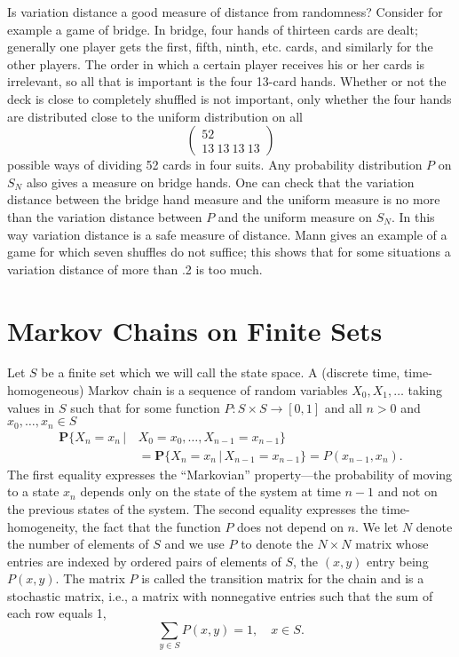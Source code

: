 \documentclass{stml-l}
\theoremstyle{definition}
\numberwithin{equation}{chapter}
\numberwithin{figure}{chapter}
\numberwithin{figure}{section}
\begin{document}
Is variation distance a good measure of distance from randomness?
Consider for example a game of bridge. In bridge, four hands of
thirteen cards are dealt; generally one player gets the first,
fifth, ninth, etc. cards, and similarly for the other players. The
order in which a certain player receives his or her cards is
irrelevant, so all that is important is the four 13-card hands.
Whether or not the deck is close to completely shuffled is not
important, only whether the four hands are distributed close to the
uniform distribution on all
\begin{equation*}
\left(\begin{matrix}
52\\
13\ 13\ 13\ 13
\end{matrix}\right)
\end{equation*}
possible ways of dividing 52 cards in four suits. Any probability
distribution $P$ on $S_{N}$ also gives a measure on bridge hands.
One can check that the variation distance between the bridge hand
measure and the uniform measure is no more than the variation
distance between $P$ and the uniform measure on $S_{N}$. In this way
variation distance is a safe measure of distance. Mann gives an
example of a game for which seven shuffles do not suffice; this
shows that for some situations a variation distance of more than .2
is too much.



\chapter{Markov Chains on Finite Sets\label{ch07:chap07}}

Let $S$ be a finite set which we will call the state space. A
(discrete time, time-homogeneous) Markov chain is a sequence of
random variables $X_{0},X_{1},\ldots$ taking values in $S$ such that
for some function $P:S\times S\rightarrow[0,1]$ and all $n
>0$ and $x_{0},\ldots,x_{n}\in S$
\begin{align*}
\mathbf{P}\{X_{n}=x_{n}\,|\,&X_{0}=x_{0},\ldots,X_{n-1}=x_{n-1}\}\\
&=\mathbf{P}\{X_{n}=x_{n}\,|\,X_{n-1}=x_{n-1}\}=P(x_{n-1},x_{n}).
\end{align*}
The first equality expresses the ``Markovian'' property---the
probability of moving to a state $x_{n}$ depends only on the state
of the system at time $n-1$ and not on the previous states of the
system. The second equality expresses the time-homogeneity, the fact
that the function $P$ does not depend on $n$. We let $N$ denote the
number of elements of $S$ and we use $P$ to denote the $N\times N$
matrix whose entries are indexed by ordered pairs of elements of
$S$, the $(x,y)$ entry being $P(x,y)$. The matrix $P$ is called the
transition matrix for the chain and is a stochastic matrix, i.e., a
matrix with nonnegative entries such that the sum of each row equals
1,
\begin{equation*}
\sum\limits_{y\in S}P(x,y)=1,\quad x\in S.
\end{equation*}
\end{document}

